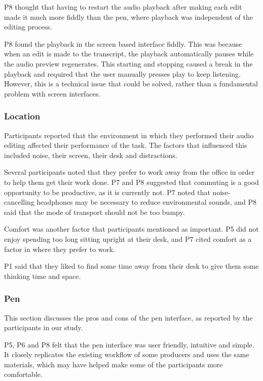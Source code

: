 
P8 thought that having to restart the audio playback after making each edit made it much more fiddly than the pen,
where playback was independent of the editing process.

P8 found the playback in the screen based interface fiddly. This was because when an edit is made to the transcript,
the playback automatically pauses while the audio preview regenerates. This starting and stopping caused a break in the
playback and required that the user manually presses play to keep listening. However, this is a technical issue that
could be solved, rather than a fundamental problem with screen interfaces.

\subsubsection{Location}

Participants reported that the environment in which they performed their audio editing affected their performance of
the task. The factors that influenced this included noise, their screen, their desk and distractions.

Several participants noted that they prefer to work away from the office in order to help them get their work done. P7
and P8 suggested that commuting is a good opportunity to be productive, as it is currently not. P7 noted that
noise-cancelling headphones may be necessary to reduce environmental sounds, and P8 said that the mode of transport
should not be too bumpy.

Comfort was another factor that participants mentioned as important. P5 did not enjoy spending too long sitting upright
at their desk, and P7 cited comfort as a factor in where they prefer to work.

P1 said that they liked to find some time away from their desk to give them some thinking time and space.

\subsubsection{Pen}

This section discusses the pros and cons of the pen interface, as reported by the participants in our study.


P5, P6 and P8 felt that the pen interface was user friendly, intuitive and simple. It closely replicates the existing
workflow of some producers and uses the same materials, which may have helped make some of the participants more
comfortable.

